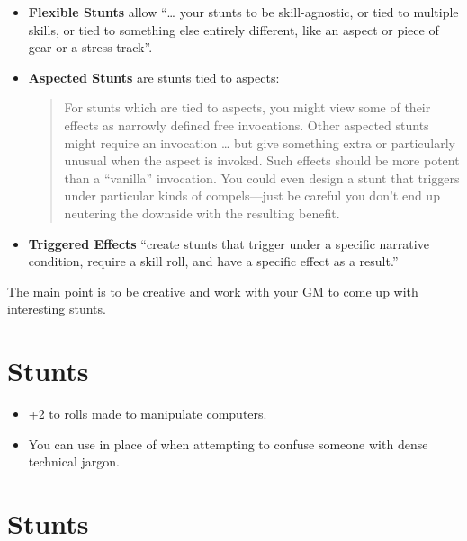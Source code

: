 \documentclass[12pt,titlepage,openany]{book}
\begin{document}
\begin{itemize}
    \item \textbf{Flexible Stunts} allow ``\ldots{} your stunts to be
        skill-agnostic, or tied to multiple skills, or tied to something else
        entirely different, like an aspect or piece of gear or a stress
        track''.

    \item \textbf{Aspected Stunts} are stunts tied to aspects:
        \begin{quote}
            For stunts which are tied to aspects, you might view some of their
            effects as narrowly defined free invocations. Other aspected stunts
            might require an invocation \ldots{} but give something extra or
            particularly unusual when the aspect is invoked. Such effects
            should be more potent than a ``vanilla'' invocation. You could even
            design a stunt that triggers under particular kinds of
            compels---just be careful you don’t end up neutering the downside
            with the resulting benefit.
        \end{quote}

    \item \textbf{Triggered Effects} ``create stunts that trigger under a
        specific narrative condition, require a skill roll, and have a specific
        effect as a result.''
\end{itemize}

\noindent
The main point is to be creative and work with your GM to come up with
interesting stunts.

\section{ Stunts}\label{sec:academics-stunts}

\begin{itemize}
    \item {} +2 to  rolls made to
        manipulate computers.
    \item {} You can use  in place of
         when attempting to confuse someone with dense technical
        jargon.
\end{itemize}

\section{ Stunts}\label{sec:bureaucracy-stunts}
\end{document}
